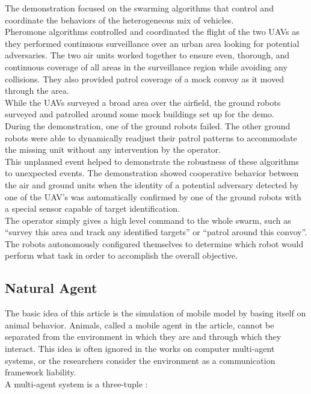 The demonstration focused on the swarming algorithms that control and coordinate the behaviors of the heterogeneous mix of vehicles.\\
Pheromone  algorithms  controlled  and  coordinated  the  flight  of  the  two  UAVs  as  they performed continuous  surveillance  over  an  urban  area  looking  for  potential  adversaries. The  two  air  units worked together to ensure even, thorough, and continuous coverage of all areas in the surveillance region  while  avoiding  any  collisions. They  also  provided  patrol coverage  of  a  mock  convoy  as  it moved through the area.\\ 
While the UAVs surveyed a broad area over the airfield, the ground robots surveyed and patrolled around  some  mock  buildings  set  up  for  the  demo.\\
During  the  demonstration,  one  of  the  ground robots  failed. The  other  ground  robots were  able  to  dynamically  readjust  their  patrol  patterns to accommodate  the  missing  unit without  any  intervention  by  the  operator.\\
This  unplanned  event helped to demonstrate the robustness of these algorithms to unexpected events. The  demonstration  showed  cooperative  behavior  between  the  air  and  ground  units when  the identity of a potential adversary detected by one of the UAV’s was automatically confirmed by one of the ground robots with a special sensor capable of target identification.\\
The operator simply gives a high level command to the whole swarm, such as “survey this area and track  any  identified  targets”  or  “patrol  around  this  convoy”.\\
The  robots  autonomously  configured themselves to determine which robot would perform what task in order to accomplish the overall objective.

\newpage

\subsection{Natural Agent}

The basic idea of this article is the simulation of mobile model by basing itself on animal behavior.
Animals, called a mobile agent in the article, cannot be separated from the environment in which they are and through which they interact. This idea is often ignored in the works on computer multi-agent systems, or the researchers consider the environment as a communication framework liability.\\
A multi-agent system is a three-tuple : 

